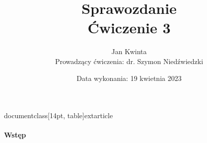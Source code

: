 documentclass[14pt, table]{extarticle}
\usepackage{amsfonts}
\usepackage{amsmath}
\usepackage[utf8]{inputenc}
\usepackage[a4paper, total={7in, 10.5in}]{geometry}
\usepackage[table]{xcolor}
\usepackage{tgbonum}
\usepackage{float}
\usepackage{graphicx}
\graphicspath{ {./images/} }
\usepackage{caption}
\usepackage{tikz}
\usepackage{circuitikz}
\usepackage[T1]{fontenc}
\usetikzlibrary{quotes,angles}
\usetikzlibrary{arrows}
\usepackage{subfig}
\usepackage{array}

\title{\textbf{Sprawozdanie} \\ \Large{Ćwiczenie 3}}
\date{Data wykonania: 19 kwietnia 2023}
\author{ \Large{Jan Kwinta} \\ \large{Prowadzący ćwiczenia: dr. Szymon Niedźwiedzki}}


\newcommand{\nl}{\vspace{0.5cm}}
\newcommand{\nz}{\vspace{1.5cm}}
\newcommand{\zatem}{\textrm{Zatem }}



\maketitle

\paragraph{Wstęp \\}



